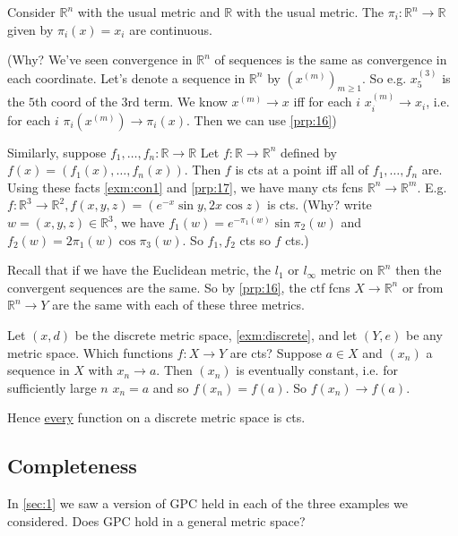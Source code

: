 \begin{example}
    Consider $\mathbb{R}^n$ with the usual metric and $\mathbb{R}$ with the usual metric.
    The  $\pi_i: \mathbb{R}^n \to \mathbb{R}$ given by $\pi_i(x) = x_i$ are continuous. 
    
    (Why? We've seen convergence in $\mathbb{R}^n$ of sequences is the same as convergence in each coordinate. 
    Let's denote a sequence in $\mathbb{R}^n$ by $(x^(m))_{m \geq 1}$. So e.g. $x^{(3)}_5$ is the $5$th coord of the $3$rd term.
    We know $x^{(m)} \to x$ iff for each $i$ $x_i^{(m)} \to x_i$, i.e. for each $i$ $\pi_i(x^{(m)}) \to \pi_i(x)$.
    Then we can use \cref{prp:16})

    Similarly, suppose $f_1, \dots, f_n: \mathbb{R} \to \mathbb{R}$
    Let $f: \mathbb{R} \to \mathbb{R}^n$ defined by $f(x) = (f_1(x), \dots, f_n(x))$.
    Then $f$ is cts at a point iff all of $f_1, \dots, f_n$ are.
    Using these facts \cref{exm:con1} and \cref{prp:17}, we have many cts fcns $\mathbb{R}^n \to \mathbb{R}^m$.
    E.g. $f: \mathbb{R}^3 \to \mathbb{R}^2, f(x, y, z) = (e^{-x} \sin y, 2x \cos z)$ is cts. (Why? write $w = (x, y, z) \in \mathbb{R}^3$, we have $f_1(w) = e^{-\pi_1(w)} \sin \pi_2(w)$ and $f_2(w) = 2 \pi_1(w) \cos \pi_3(w)$.
    So $f_1, f_2$ cts so $f$ cts.)
\end{example} 

\begin{example}
    Recall that if we have the Euclidean metric, the $l_1$ or $l_\infty$ metric on $\mathbb{R}^n$ then the convergent sequences are the same.
    So by \cref{prp:16}, the ctf fcns $X \to \mathbb{R}^n$ or from $\mathbb{R}^n \to Y$ are the same with each of these three metrics.
\end{example} 

\begin{example}
    Let $(x, d)$ be the discrete metric space, \cref{exm:discrete}, and let $(Y, e)$ be any metric space.
    Which functions $f : X \to Y$ are cts?
    Suppose $a \in X$ and $(x_n)$ a sequence in $X$ with $x_n \to a$.
    Then $(x_n)$ is eventually constant, i.e. for sufficiently large $n$ $x_n = a$ and so $f(x_n) = f(a)$.
    So $f(x_n) \to f(a)$.

    Hence \underline{every} function on a discrete metric space is cts.
\end{example} 

\subsection{Completeness}
\begin{question}
    In \cref{sec:1} we saw a version of GPC held in each of the three examples we considered. 
    Does GPC hold in a general metric space?
\end{question} 

